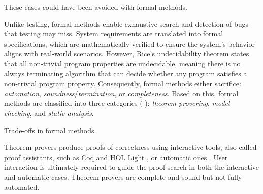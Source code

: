 These cases could have been avoided with formal methods.

Unlike testing, formal methods enable exhaustive search and detection of bugs that testing may miss.
System requirements are translated into formal specifications, which are mathematically verified to ensure the system's behavior aligns with real-world scenarios.
However, Rice's undecidability theorem  states that all non-trivial program properties are undecidable, meaning there is no always terminating algorithm that can decide whether any program satisfies a non-trivial program property.
Consequently, formal methods either sacrifice: \emph{automation}, \emph{soundness}/\emph{termination}, or \emph{completeness}.
Based on this, formal methods are classified into three categories  (\cf{} ): \emph{theorem provering}, \emph{model checking}, and \emph{static analysis}.

\begin{marginfigure}
  \caption{Trade-offs in formal methods.}
\end{marginfigure}

Theorem provers  produce proofs of correctness using interactive tools, also called proof assistants, such as Coq  and HOL Light , or automatic ones .
User interaction is ultimately required to guide the proof search in both the interactive and automatic cases.
Theorem provers are complete and sound but not fully automated.

